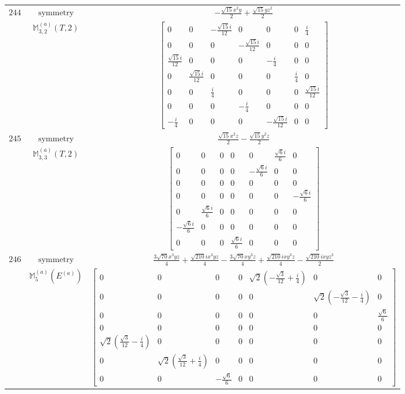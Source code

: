 \documentclass[fleqn,8pt,landscape]{jsarticle}
\begin{document}
\begin{longtable}{ccc}
$ 244 $ & $ \text{symmetry} $ & $ - \frac{\sqrt{15} x^{2} y}{2} + \frac{\sqrt{15} y z^{2}}{2} $ \\
$  $ & $ \mathbb{M}_{3,2}^{(a)}(T,2) $ & $ \begin{bmatrix} 0 & 0 & - \frac{\sqrt{15} i}{12} & 0 & 0 & 0 & \frac{i}{4} \\ 0 & 0 & 0 & - \frac{\sqrt{15} i}{12} & 0 & 0 & 0 \\ \frac{\sqrt{15} i}{12} & 0 & 0 & 0 & - \frac{i}{4} & 0 & 0 \\ 0 & \frac{\sqrt{15} i}{12} & 0 & 0 & 0 & \frac{i}{4} & 0 \\ 0 & 0 & \frac{i}{4} & 0 & 0 & 0 & \frac{\sqrt{15} i}{12} \\ 0 & 0 & 0 & - \frac{i}{4} & 0 & 0 & 0 \\ - \frac{i}{4} & 0 & 0 & 0 & - \frac{\sqrt{15} i}{12} & 0 & 0 \end{bmatrix} $ \\ \hline
$ 245 $ & $ \text{symmetry} $ & $ \frac{\sqrt{15} x^{2} z}{2} - \frac{\sqrt{15} y^{2} z}{2} $ \\
$  $ & $ \mathbb{M}_{3,3}^{(a)}(T,2) $ & $ \begin{bmatrix} 0 & 0 & 0 & 0 & 0 & \frac{\sqrt{6} i}{6} & 0 \\ 0 & 0 & 0 & 0 & - \frac{\sqrt{6} i}{6} & 0 & 0 \\ 0 & 0 & 0 & 0 & 0 & 0 & 0 \\ 0 & 0 & 0 & 0 & 0 & 0 & - \frac{\sqrt{6} i}{6} \\ 0 & \frac{\sqrt{6} i}{6} & 0 & 0 & 0 & 0 & 0 \\ - \frac{\sqrt{6} i}{6} & 0 & 0 & 0 & 0 & 0 & 0 \\ 0 & 0 & 0 & \frac{\sqrt{6} i}{6} & 0 & 0 & 0 \end{bmatrix} $ \\ \hline
$ 246 $ & $ \text{symmetry} $ & $ \frac{3 \sqrt{70} x^{3} y z}{4} + \frac{\sqrt{210} i x^{3} y z}{4} - \frac{3 \sqrt{70} x y^{3} z}{4} + \frac{\sqrt{210} i x y^{3} z}{4} - \frac{\sqrt{210} i x y z^{3}}{2} $ \\
$  $ & $ \mathbb{M}_{5}^{(a)}(E^{(a)}) $ & $ \begin{bmatrix} 0 & 0 & 0 & 0 & \sqrt{2} \left(- \frac{\sqrt{3}}{12} + \frac{i}{4}\right) & 0 & 0 \\ 0 & 0 & 0 & 0 & 0 & \sqrt{2} \left(- \frac{\sqrt{3}}{12} - \frac{i}{4}\right) & 0 \\ 0 & 0 & 0 & 0 & 0 & 0 & \frac{\sqrt{6}}{6} \\ 0 & 0 & 0 & 0 & 0 & 0 & 0 \\ \sqrt{2} \left(\frac{\sqrt{3}}{12} - \frac{i}{4}\right) & 0 & 0 & 0 & 0 & 0 & 0 \\ 0 & \sqrt{2} \left(\frac{\sqrt{3}}{12} + \frac{i}{4}\right) & 0 & 0 & 0 & 0 & 0 \\ 0 & 0 & - \frac{\sqrt{6}}{6} & 0 & 0 & 0 & 0 \end{bmatrix} $ \\ \hline

\end{longtable}
\end{document}
